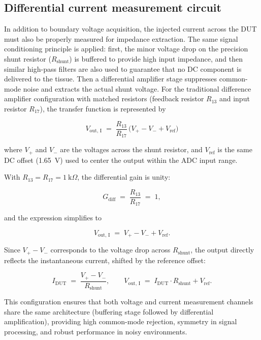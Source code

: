 \subsection{Differential current measurement circuit}  
In addition to boundary voltage acquisition, the injected current across the DUT must also be properly measured for impedance extraction. The same signal conditioning principle is applied:
first, the minor voltage drop on the precision shunt resistor ($R_{\text{shunt}}$) is buffered to provide high input impedance, and then similar high-pass filters are also used to guarantee that no DC component is delivered to the tissue. Then a differential amplifier stage suppresses common-mode
noise and extracts the actual shunt voltage.
For the traditional difference amplifier configuration with matched resistors (feedback
resistor $R_13$ and input resistor $R_17$), the transfer function is represented by



\begin{equation}
V_{\mathrm{out,\,I}} \;=\; \frac{R_{13}}{R_{17}}\,\bigl(V_{+} - V_{-} + V_{\mathrm{ref}}\bigr)
\end{equation}


where $V_{+}$ and $V_{-}$ are the voltages across the shunt resistor, and $V_{\mathrm{ref}}$ is the same DC offset (1.65~V) used to center the output within the ADC input range.

With $R_13 = R_17 = 1~\text{k}\Omega$, the differential gain is unity:

\begin{equation}
G_{\mathrm{diff}} \;=\; \frac{R_13}{R_17} \;=\; 1,
\end{equation}

and the expression simplifies to

\begin{equation}
V_{\mathrm{out,\,I}} \;=\; V_{+} - V_{-} + V_{\mathrm{ref}}.
\end{equation}

Since $V_{+}-V_{-}$ corresponds to the voltage drop across $R_{\text{shunt}}$, the output directly reflects the instantaneous current, shifted by the reference offset:

\begin{equation}
I_{\text{DUT}} \;=\; \frac{V_{+} - V_{-}}{R_{\text{shunt}}}, \qquad
V_{\mathrm{out,\,I}} \;=\; I_{\text{DUT}} \cdot R_{\text{shunt}} + V_{\mathrm{ref}}.
\end{equation}

This configuration ensures that both voltage and current measurement channels share the same architecture (buffering stage followed by differential amplification), providing high common-mode rejection, symmetry in signal processing, and robust performance in noisy environments.
  
